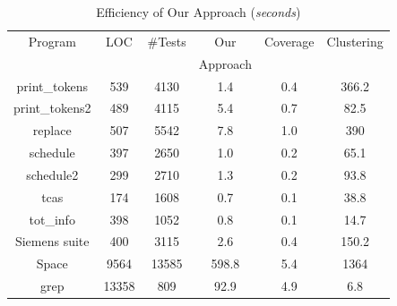 \documentclass{sig-alternate}
\begin{document}
\begin{table}[t]
\caption{Efficiency of Our Approach
(\emph{seconds})}\label{tab:effi} \center
\begin{tabular}{|c|c|c|c|c|c|}
\hline Program   & LOC \hspace{-0.3cm}& \hspace{-0.2cm}\#Tests\hspace{-0.1cm} & Our  & \hspace{-0.1cm}Coverage\hspace{-0.1cm} & \hspace{-0.1cm}Clustering\hspace{-0.1cm}   \\
& & & \hspace{-0.1cm}\footnotesize{Approach}\hspace{-0.1cm} &  &  \\

\hline  print\_tokens   &   539 &   4130    &   1.4 &   0.4 &   366.2   \\
\hline  print\_tokens2  &   489 &   4115    &   5.4 &   0.7 &   82.5    \\
\hline  replace &   507 &   5542    &   7.8 &   1.0 &   390 \\
\hline  schedule    &   397 &   2650    &   1.0 &   0.2 &   65.1    \\
\hline  schedule2   &   299 &   2710    &   1.3 &   0.2 &   93.8    \\
\hline  tcas    &   174 &   1608    &   0.7 &   0.1 &   38.8    \\
\hline  tot\_info   &   398 &   1052    &   0.8 &   0.1 &   14.7    \\
\hline  \hspace{-0.1cm}Siemens suite\hspace{-0.1cm}   &   400 &   3115    &   2.6 &   0.4 &   150.2   \\
\hline  Space   &   9564    &   13585   &   598.8   &   5.4 &   1364    \\
\hline  grep    &   \hspace{-0.1cm}13358 \hspace{-0.1cm}  &   809 &   92.9    &   4.9 &   6.8 \\


\hline
\end{tabular} \vspace{-0.2in}
\end{table}
\end{document}
